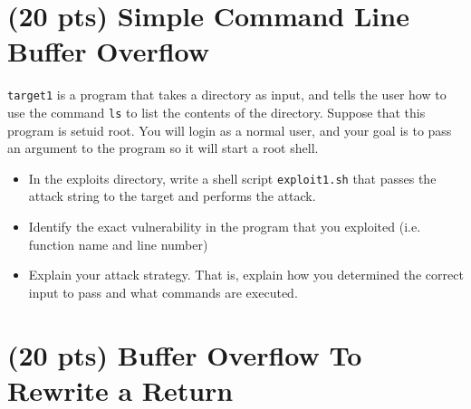 \documentclass[11pt]{article}
\begin{document}
\section{(20 pts) Simple Command Line Buffer Overflow}

\verb"target1" is a program that takes a directory as input, and tells the user how to use the command \verb"ls" to list the contents of the directory. Suppose that this program is setuid root. You will login as a normal user, and your goal is to pass an argument to the program so it will start a root shell.
	
	\begin{itemize}
		\item In the exploits directory, write a shell script \verb"exploit1.sh" that passes the attack string to the target and performs the attack.
		\item Identify the exact vulnerability in the program that you exploited (i.e. function name and line number)
		\item Explain your attack strategy. That is, explain how you determined the correct input to pass and what commands are executed.
	\end{itemize}
	
\section{(20 pts) Buffer Overflow To Rewrite a Return}
\label{sec:buffer_overflow}
\end{document}
